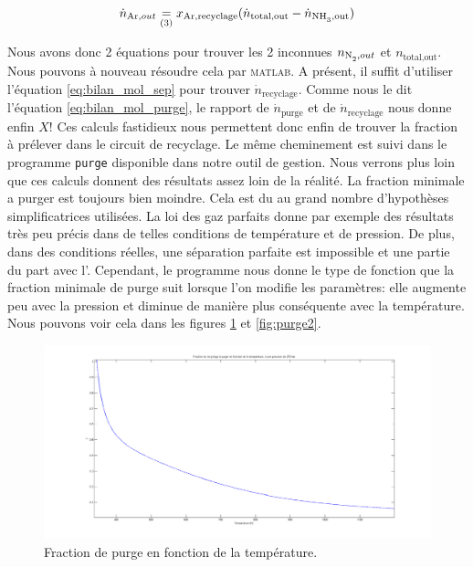 \documentclass[a4paper, oneside, 12pt]{article}
\begin{document}
\[ 
\dot{n}_{\ce{Ar},out}\underset{(3)} = 
x_{\ce{Ar},\text{recyclage}}(\dot{n}_{\text{total,out}}-\dot{n}_{\ce{NH3},\text{out}}) 
\]

Nous avons donc 2 équations pour trouver 
les 2 inconnues $n_{\ce{N2},out}$ et $n_{\text{total,out}}$. 
Nous pouvons à nouveau résoudre cela par \textsc{matlab}. 
A présent, il suffit d'utiliser l'équation \ref{eq:bilan_mol_sep} 
pour trouver $\dot{n}_{\text{recyclage}}$. 
Comme nous le dit l'équation \ref{eq:bilan_mol_purge}, 
le rapport de $\dot{n}_{\text{purge}}$ 
et de $\dot{n}_{\text{recyclage}}$ nous donne enfin $X$! 
Ces calculs fastidieux nous permettent donc enfin de trouver la fraction à prélever 
dans le circuit de recyclage. 
Le même cheminement est suivi dans le programme \texttt{purge} 
disponible dans notre outil de gestion. Nous verrons plus loin que ces calculs donnent
des résultats assez loin de la réalité. La fraction minimale a purger est toujours
bien moindre. Cela est du au grand nombre d'hypothèses simplificatrices utilisées. 
La loi des gaz parfaits donne par exemple des résultats très peu précis 
dans de telles conditions de température et de pression. 
De plus, dans des conditions réelles, une séparation parfaite est impossible 
et une partie du  part avec l'.
Cependant, le programme nous donne le type de fonction que la fraction minimale de purge
suit lorsque l'on modifie les paramètres: elle augmente peu avec la pression et diminue
de manière plus conséquente avec la température. Nous pouvons voir cela dans les figures
\ref{fig:purge1} et \ref{fig:purge2}.

\begin{figure}[h!]
	\begin{center}
		\includegraphics[scale=0.3]{purge1.png}
	\end{center}
	\caption{Fraction de purge en fonction de la température.}
	\label{fig:purge1}
\end{figure}
\end{document}
